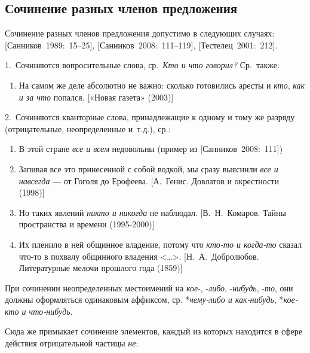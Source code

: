 \subsection{Сочинение разных членов
предложения}\label{ux441ux43eux447ux438ux43dux435ux43dux438ux435-ux440ux430ux437ux43dux44bux445-ux447ux43bux435ux43dux43eux432-ux43fux440ux435ux434ux43bux43eux436ux435ux43dux438ux44f}

Сочинение разных членов предложения допустимо в следующих случаях:
{[}Санников~1989:~15--25{]}, {[}Санников~2008:~111--119{]},
{[}Тестелец~2001:~212{]}.

1.~Сочиняются вопросительные слова, ср.~\textit{Кто и что говорил?}
Ср.~также:

\begin{enumerate}
\def\labelenumi{(\arabic{enumi})}
\setcounter{enumi}{32}
\item
  На самом же деле абсолютно не важно: сколько готовились аресты и
  \textit{кто}, \textit{как и за что} попался. {[}«Новая газета» (2003){]}
\end{enumerate}

2.~Сочиняются кванторные слова, принадлежащие к одному и тому же разряду
(отрицательные, неопределенные и~т.д.), ср.:

\begin{enumerate}
\def\labelenumi{(\arabic{enumi})}
\setcounter{enumi}{33}
\item
  В этой стране \textit{все и всем} недовольны (пример из
  {[}Санников~2008:~111{]})
\item
  Запивая все это принесенной с собой водкой, мы сразу выяснили
  \textit{все и навсегда} ― от Гоголя до Ерофеева. {[}А.~Генис. Довлатов и
  окрестности (1998){]}
\item
  Но таких явлений \textit{никто и никогда} не наблюдал. {[}В.~Н.~Комаров.
  Тайны пространства и времени (1995-2000){]}
\item
  Их пленило в ней общинное владение, потому что \textit{кто-то и
  когда-то} сказал что-то в похвалу общинного владения
  \textless\ldots\textgreater. {[}Н.~А.~Добролюбов. Литературные мелочи
  прошлого года (1859){]}
\end{enumerate}

При сочинении неопределенных местоимений на \textit{кое}-, -\textit{либо},
-\textit{нибудь}, -\textit{то}, они должны оформляться одинаковым аффиксом,
ср. *\textit{чему-либо и как-нибудь}, *\textit{кое-кто и что-нибудь}.

Сюда же примыкает сочинение элементов, каждый из которых находится в
сфере действия отрицательной частицы \textit{не}:

